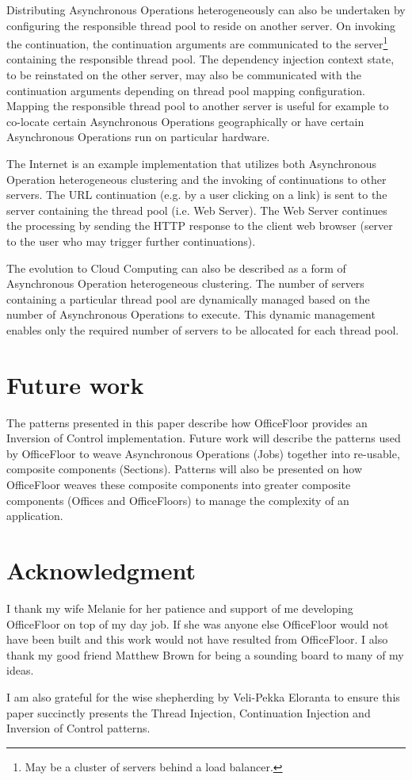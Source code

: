\documentclass[prodmode]{style/acmlarge}
\begin{document}
Distributing Asynchronous Operations heterogeneously can also be undertaken by
configuring the responsible thread pool to reside on another server.  On
invoking the continuation, the continuation arguments are communicated to the
server\footnote{May be a cluster of servers behind a load balancer.} containing
the responsible thread pool.  The dependency injection context state, to be
reinstated on the other server, may also be communicated with the continuation
arguments depending on thread pool mapping configuration.  Mapping the
responsible thread pool to another server is useful for example to co-locate
certain Asynchronous Operations geographically or have certain Asynchronous
Operations run on particular hardware.

The Internet is an example implementation that utilizes both Asynchronous
Operation heterogeneous clustering and the invoking of continuations to other
servers.  The URL continuation (e.g. by a user clicking on a link) is sent to
the server containing the thread pool (i.e. Web Server).  The Web Server
continues the processing by sending the HTTP response to the client web browser
(server to the user who may trigger further continuations).

The evolution to Cloud Computing can also be described as a form of Asynchronous
Operation heterogeneous clustering.  The number of servers containing a
particular thread pool are dynamically managed based on the number of
Asynchronous Operations to execute.  This dynamic management enables only the
required number of servers to be allocated for each thread pool.



\section{Future work}

The patterns presented in this paper describe how OfficeFloor \cite{officefloor}
provides an Inversion of Control implementation.  Future work will describe the
patterns used by OfficeFloor to weave Asynchronous Operations (Jobs) together
into re-usable, composite components (Sections).  Patterns will also be
presented on how OfficeFloor weaves these composite components into greater
composite components (Offices and OfficeFloors) to manage the complexity of an
application.



\section*{Acknowledgment} I thank my wife Melanie for her patience and support
of me developing OfficeFloor on top of my day job.  If she was anyone else
OfficeFloor would not have been built and this work would not have resulted from
OfficeFloor.  I also thank my good friend Matthew Brown for being a sounding
board to many of my ideas.

I am also grateful for the wise shepherding by Veli-Pekka Eloranta to ensure
this paper succinctly presents the Thread Injection, Continuation Injection and
Inversion of Control patterns.




\end{document}
